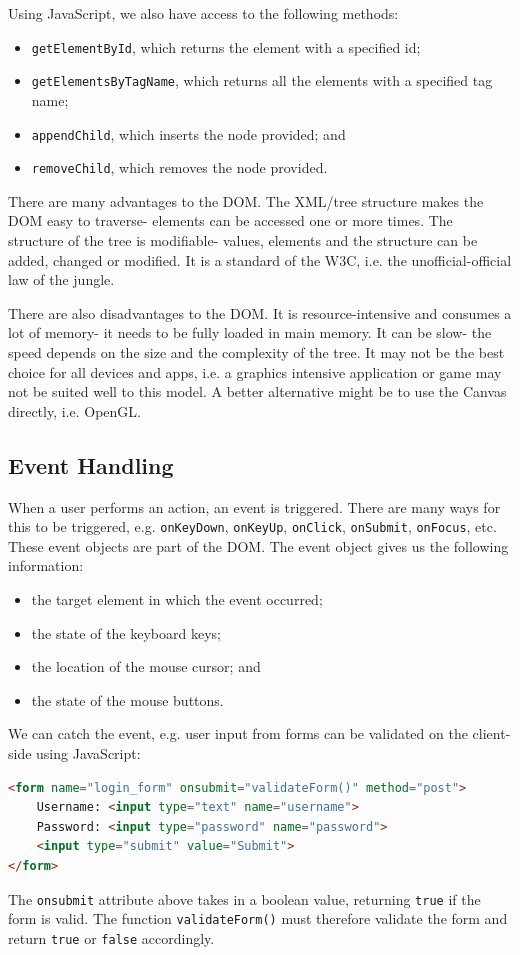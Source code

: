 \documentclass[a4paper, openany]{memoir}
\begin{document}
Using JavaScript, we also have access to the following methods:
\begin{itemize}
    \item \texttt{getElementById}, which returns the element with a specified id;
    \item \texttt{getElementsByTagName}, which returns all the elements with a specified tag name;
    \item \texttt{appendChild}, which inserts the node provided; and
    \item \texttt{removeChild}, which removes the node provided.
\end{itemize}
There are many advantages to the DOM. The XML/tree structure makes the DOM easy to traverse- elements can be accessed one or more times. The structure of the tree is modifiable- values, elements and the structure can be added, changed or modified. It is a standard of the W3C, i.e. the unofficial-official law of the jungle.

There are also disadvantages to the DOM. It is resource-intensive and consumes a lot of memory- it needs to be fully loaded in main memory. It can be slow- the speed depends on the size and the complexity of the tree. It may not be the best choice for all devices and apps, i.e. a graphics intensive application or game may not be suited well to this model. A better alternative might be to use the Canvas directly, i.e. OpenGL.

\subsection{Event Handling}
When a user performs an action, an event is triggered. There are many ways for this to be triggered, e.g. \texttt{onKeyDown}, \texttt{onKeyUp}, \texttt{onClick}, \texttt{onSubmit}, \texttt{onFocus}, etc. These event objects are part of the DOM. The event object gives us the following information:
\begin{itemize}
    \item the target element in which the event occurred;
    \item the state of the keyboard keys;
    \item the location of the mouse cursor; and
    \item the state of the mouse buttons.
\end{itemize}
We can catch the event, e.g. user input from forms can be validated on the client-side using JavaScript:
\begin{lstlisting}[language=html]
<form name="login_form" onsubmit="validateForm()" method="post">
    Username: <input type="text" name="username">
    Password: <input type="password" name="password">
    <input type="submit" value="Submit">
</form>
\end{lstlisting}
The \texttt{onsubmit} attribute above takes in a boolean value, returning \texttt{true} if the form is valid. The function \texttt{validateForm()} must therefore validate the form and return \texttt{true} or \texttt{false} accordingly.
\end{document}
